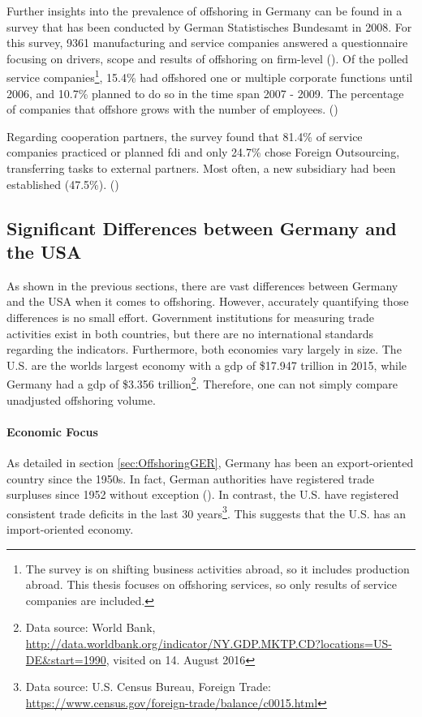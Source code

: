 Further insights into the prevalence of offshoring in Germany can be found in a survey that has been conducted by German Statistisches Bundesamt in 2008. For this survey, 9361 manufacturing and service companies answered a questionnaire focusing on drivers, scope and results of offshoring on firm-level (\cite[p. 7]{StatistischesBundesamt.2008}). Of the polled service companies\footnote{The survey is on shifting business activities abroad, so it includes production abroad. This thesis focuses on offshoring services, so only results of service companies are included.}, 15.4\% had offshored one or multiple corporate functions until 2006, and 10.7\% planned to do so in the time span 2007 - 2009. The percentage of companies that offshore grows with the number of employees. (\cite[p. 11]{StatistischesBundesamt.2008})

Regarding cooperation partners, the survey found that 81.4\% of service companies practiced or planned \gls{fdi} and only 24.7\% chose Foreign Outsourcing, transferring tasks to external partners. Most often, a new subsidiary had been established (47.5\%). (\cite[p. 18]{StatistischesBundesamt.2008})



\subsection{Significant Differences between Germany and the USA}
\label{sec:DifferencesUSGER}
As shown in the previous sections, there are vast differences between Germany and the USA when it comes to offshoring. However, accurately quantifying those differences is no small effort. Government institutions for measuring trade activities exist in both countries, but there are no international standards regarding the indicators. Furthermore, both economies vary largely in size. The U.S. are the worlds largest economy with a \gls{gdp} of \$17.947 trillion in 2015, while Germany had a \gls{gdp} of \$3.356 trillion\footnote{Data source: World Bank, \url{http://data.worldbank.org/indicator/NY.GDP.MKTP.CD?locations=US-DE&start=1990}, visited on 14. August 2016}. Therefore, one can not simply compare unadjusted offshoring volume.

\paragraph{Economic Focus}
As detailed in section \ref{sec:OffshoringGER}, Germany has been an export-oriented country since the 1950s. In fact, German authorities have registered trade surpluses since 1952 without exception (\cite{StatistischesBundesamt.2016}).
In contrast, the U.S. have registered consistent trade deficits in the last 30 years\footnote{Data source: U.S. Census Bureau, Foreign Trade: \url{https://www.census.gov/foreign-trade/balance/c0015.html}}. This suggests that the U.S. has an import-oriented economy. 

